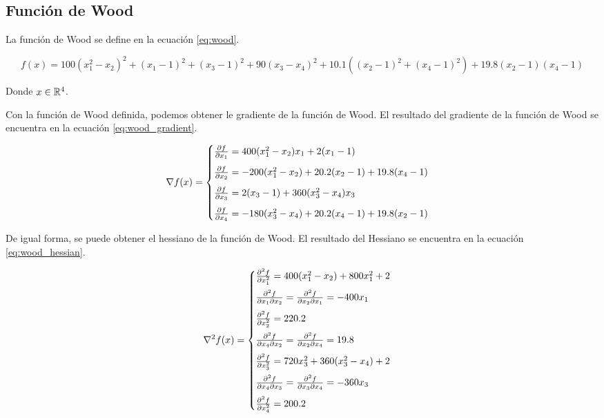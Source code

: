 \subsection{Función de Wood}

La función de Wood se define en la ecuación \ref{eq:wood}.

\begin{equation}
    f(x) = 100(x_1^2-x_2)^2+(x_1-1)^2+(x_3-1)^2+90(x_3-x_4)^2 +10.1((x_2-1)^2+(x_4-1)^2)+19.8(x_2-1)(x_4-1) \label{eq:wood}
\end{equation}

Donde $x\in \mathbb{R}^4$.

Con la función de Wood definida, podemos obtener le gradiente de la función de Wood. El resultado del gradiente de la función de Wood se encuentra en la ecuación \ref{eq:wood_gradient}.

\begin{equation}
    \nabla f(x) = \begin{cases}
        \frac{\partial f}{\partial x_1}=400(x_1^2-x_2)x_1 +2(x_1-1)             \\[0.25cm]
        \frac{\partial f}{\partial x_2}=-200(x_1^2-x_2)+20.2(x_2-1)+19.8(x_4-1) \\[0.25cm]
        \frac{\partial f}{\partial x_3}=2(x_3-1)+360(x_3^2-x_4)x_3              \\[0.25cm]
        \frac{\partial f}{\partial x_4}=-180(x_3^2-x_4)+20.2(x_4-1)+19.8(x_2-1)
    \end{cases} \label{eq:wood_gradient}
\end{equation}

De igual forma, se puede obtener el hessiano de la función de Wood. El resultado del Hessiano se encuentra en la ecuación \ref{eq:wood_hessian}.

\begin{equation}
    \nabla^2 f(x) = \begin{cases}
        \frac{\partial^2 f}{\partial x_1^2} = 400(x_1^2-x_2)+800x_1^2+2             \\[0.25cm]
        \frac{\partial^2 f}{\partial x_1 \partial x_2} =\frac{\partial^2 f}{\partial x_2 \partial x_1} = -400x_1 \\[0.25cm]
        \frac{\partial^2 f}{\partial x_2^2} = 220.2                                 \\[0.25cm]
        \frac{\partial^2 f}{\partial x_4 \partial x_2} = \frac{\partial^2 f}{\partial x_2 \partial x_4} = 19.8   \\[0.25cm]
        \frac{\partial^2 f}{\partial x_3^2} = 720x_3^2+360(x_3^2-x_4)+2             \\[0.25cm]
        \frac{\partial^2 f}{\partial x_4 \partial x_3}=\frac{\partial^2 f}{\partial x_3 \partial x_4} = -360x_3  \\[0.25cm]
        \frac{\partial^2 f}{\partial x_4^2} = 200.2
    \end{cases} \label{eq:wood_hessian}
\end{equation}


